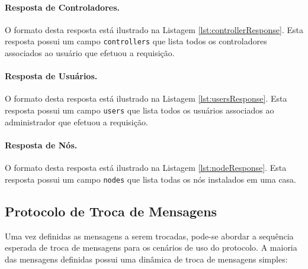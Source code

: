 \noindent
\begin{minipage}[l]{\linewidth}

\end{minipage}

\paragraph*{Resposta de Controladores.} O formato desta resposta está ilustrado na Listagem \ref{lst:controllerResponse}. Esta resposta possui um campo \texttt{controllers} que lista todos os controladores associados ao usuário que efetuou a requisição.

\noindent
\begin{minipage}[l]{\linewidth}

\end{minipage}

\paragraph*{Resposta de Usuários.} O formato desta resposta está ilustrado na Listagem \ref{lst:usersResponse}. Esta resposta possui um campo \texttt{users} que lista todos os usuários associados ao administrador que efetuou a requisição.

\noindent
\begin{minipage}[l]{\linewidth}

\end{minipage}

\paragraph*{Resposta de Nós.} O formato desta resposta está ilustrado na Listagem \ref{lst:nodeResponse}. Esta resposta possui um campo \texttt{nodes} que lista todas os nós instalados em uma casa.



\clearpage

\subsection{Protocolo de Troca de Mensagens}
Uma vez definidas as mensagens a serem trocadas, pode-se abordar a sequência esperada de troca de mensagens para os cenários de uso do protocolo. A maioria das mensagens definidas possui uma dinâmica de troca de mensagens simples:

